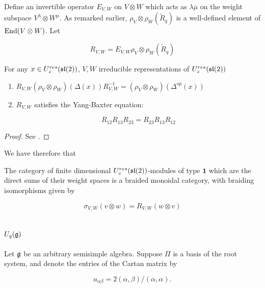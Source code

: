 Define an invertible operator $E_{V,W}$ on $V \otimes W$ which acts as
$\lambda\overline{\mu}$ on the weight subspace $V^\lambda \otimes W^\mu$. As remarked
earlier, $\rho_V \otimes \rho_W (\tilde{R}_q) $ is a well-defined element of
$\operatorname{End}(V \otimes W)$. Let 

\begin{equation}
R_{V,W} = E_{V,W} \rho_V \otimes \rho_W (\tilde{R}_q)
\end{equation}

\begin{claim}
For any $x \in U_z^{res}(\mathfrak{sl}(2))$, $V,W$ irreducible representations of $U_z^{res}(\mathfrak{sl}(2))$
\begin{enumerate}
\item $R_{V,W} (\rho_V \otimes \rho_W) (\Delta(x)) R^{-1}_{V,W} = (\rho_{V} \otimes \rho_W)(\Delta^{op}(x))$
\item $R_{V,W}$  satisfies the Yang-Baxter equation: 

\begin{equation}
R_{12} R_{13} R_{23} = R_{23} R_{13} R_{12}
\end{equation}
\end{enumerate}
\end{claim}
\begin{proof}
    See \cite{CP}.
\end{proof}

We have therefore that 

\begin{theorem}
The category of finite dimensional $U_z^{res}(\mathfrak{sl}(2))$-modules of type
$\mathbf{1}$ which are the direct sums of their weight spaces is a braided
monoidal category, with braiding isomorphisms given by 

\begin{equation}
\sigma_{V,W}(v \otimes w) = R_{V,W}(w \otimes v)
\end{equation}
\end{theorem}


\section{$U_q(\mathfrak{g})$}
\label{U_q(g)}


    Let $\mathfrak{g}$ be an arbitrary semisimple algebra. Suppose $\Pi$ is
    a basis of the root system, and denote the entries of the Cartan matrix
    by 

    \begin{equation}
        a_{\alpha\beta} = 2(\alpha, \beta) / (\alpha, \alpha).
    \end{equation}

